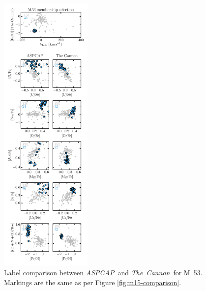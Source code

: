 \documentclass[12pt,preprint]{aastex}
\newcommand{\project}[1]{\textsl{#1}}
\newcommand{\TheCannon}{\project{The~Cannon}}
\newcommand{\acronym}[1]{{\small{#1}}}
\newcommand{\aspcap}{\project{\acronym{ASPCAP}}}
\begin{document}
\begin{figure}[p]
\includegraphics[width=0.4\textwidth]{M53_comparison.pdf}
\caption{Label comparison between \aspcap\ and \TheCannon\ for M~53.
Markings are the same as per Figure \ref{fig:m15-comparison}.
\label{fig:m53-comparison}}
\end{figure}

\clearpage
\end{document}
